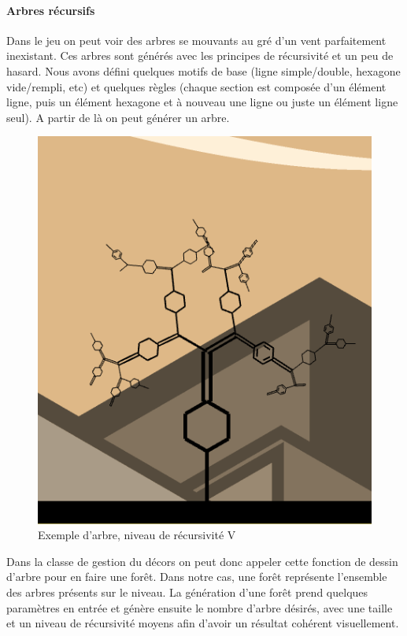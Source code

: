 \documentclass[a4paper,10pt]{article}
\begin{document}
  \paragraph{Arbres récursifs}
  Dans le jeu on peut voir des arbres se mouvants au gré d'un vent parfaitement inexistant. Ces arbres sont générés avec les principes de récursivité et un peu de hasard. Nous avons défini quelques motifs de base (ligne simple/double, hexagone vide/rempli, etc) et quelques règles (chaque section est composée d'un élément ligne, puis un élément hexagone et à nouveau une ligne ou juste un élément ligne seul). A partir de là on peut générer un arbre.
 \begin{figure}[!h]
 \centering
 \vspace{-10pt}
 \includegraphics[scale=0.4]{images/tree}
 \caption{Exemple d'arbre, niveau de récursivité V}
 \end{figure}
  \newline Dans la classe de gestion du décors on peut donc appeler cette fonction de dessin d'arbre pour en faire une forêt. Dans notre cas, une forêt représente l'ensemble des arbres présents sur le niveau. La génération d'une forêt prend quelques paramètres en entrée et génère ensuite le nombre d'arbre désirés, avec une taille et un niveau de récursivité moyens afin d'avoir un résultat cohérent visuellement.
\end{document}
